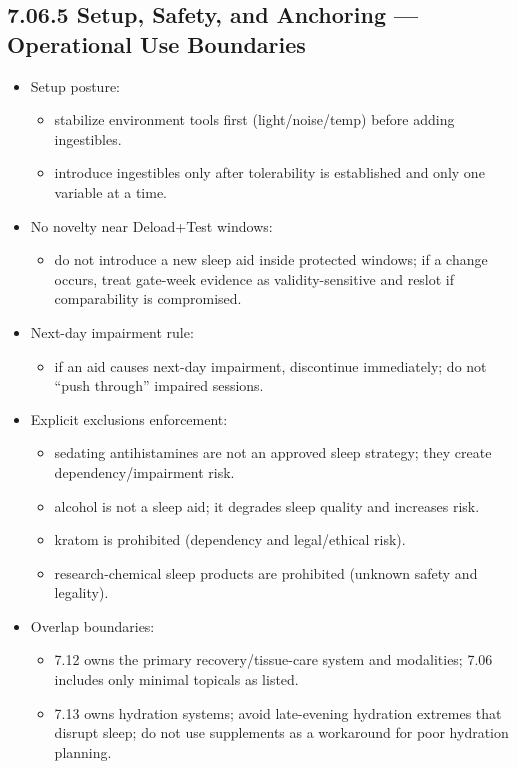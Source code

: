 \documentclass[10pt]{article}
\begin{document}
\subsection*{7.06.5 Setup, Safety, and Anchoring — Operational Use Boundaries}
{}

\begin{itemize}
\item Setup posture:
  \begin{itemize}
  \item stabilize environment tools first (light/noise/temp) before adding ingestibles.
  \item introduce ingestibles only after tolerability is established and only one variable at a time.
  \end{itemize}
\item No novelty near Deload+Test windows:
  \begin{itemize}
  \item do not introduce a new sleep aid inside protected windows; if a change occurs, treat gate-week evidence as validity-sensitive and reslot if comparability is compromised.
  \end{itemize}
\item Next-day impairment rule:
  \begin{itemize}
  \item if an aid causes next-day impairment, discontinue immediately; do not “push through” impaired sessions.
  \end{itemize}
\item Explicit exclusions enforcement:
  \begin{itemize}
  \item sedating antihistamines are not an approved sleep strategy; they create dependency/impairment risk.
  \item alcohol is not a sleep aid; it degrades sleep quality and increases risk.
  \item kratom is prohibited (dependency and legal/ethical risk).
  \item research-chemical sleep products are prohibited (unknown safety and legality).
  \end{itemize}
\item Overlap boundaries:
  \begin{itemize}
  \item 7.12 owns the primary recovery/tissue-care system and modalities; 7.06 includes only minimal topicals as listed.
  \item 7.13 owns hydration systems; avoid late-evening hydration extremes that disrupt sleep; do not use supplements as a workaround for poor hydration planning.
  \end{itemize}
\end{itemize}
\end{document}
